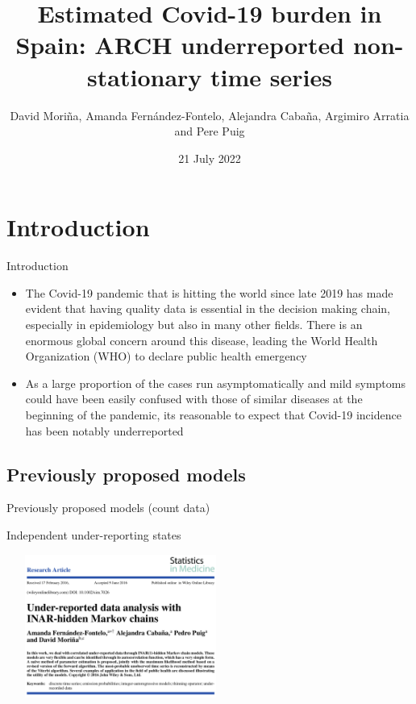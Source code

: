 \documentclass[aspectratio=169,usepdftitle=true]{beamer}
\title{Estimated Covid-19 burden in Spain: ARCH underreported non-stationary time series}
\institute{International Workshop on Statistical Modelling 2022}
\date{21 July 2022}
\author{David Mori\~na, Amanda Fern\'andez-Fontelo, Alejandra Caba\~na, Argimiro Arratia and Pere Puig}
\begin{document}
\section{Introduction}

\begin{frame}{Introduction}
\begin{itemize}
 \item The Covid-19 pandemic that is hitting the world since late 2019 has made evident that having quality data is essential in the decision making chain, especially in epidemiology but also in many other fields. There is an enormous global concern around this disease, leading the World Health Organization (WHO) to declare public health emergency
 \item As a large proportion of the cases run asymptomatically and mild symptoms could have been easily confused with those of similar diseases at the beginning of the pandemic, its reasonable to expect that Covid-19 incidence has been notably underreported
\end{itemize}
\end{frame}

\subsection{Previously proposed models}
\begin{frame}[c]{Previously proposed models (count data)}
    \begin{block}{Independent under-reporting states}
        \begin{center}
           \includegraphics[height=4.7cm,width=7.5cm]{SiM1.png}
        \end{center}
    \end{block}
\end{frame}
\end{document}
